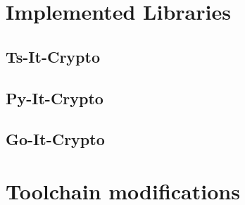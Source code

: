 \documentclass[../main.tex]{subfiles}
\begin{document}
\section{Implemented Libraries}
\label{sec:implemented-libraries}

\subsection{Ts-It-Crypto}

\subsection{Py-It-Crypto}

\subsection{Go-It-Crypto}

\section{Toolchain modifications}
\label{sec:toolchain-modifications}
\end{document}
